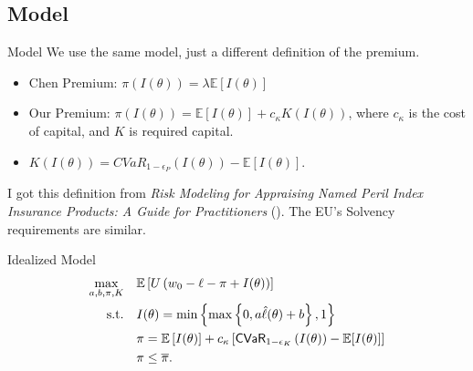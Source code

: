 \documentclass{beamer}
\begin{document}
\subsection{Model}
\begin{frame}{Model}
    We use the same model, just a different definition of the premium.
    \vspace*{1em}
    \begin{itemize}
        \setlength\itemsep{2em}
        \item Chen Premium: $\pi(I(\theta)) = \lambda \mathbb{E}[I(\theta)]$
        \item Our Premium: $\pi(I(\theta)) = \mathbb{E}[I(\theta)] + c_{\kappa} K(I(\theta))$, where $c_{\kappa}$ is the cost of capital, and $K$ is required capital.
    \item $K(I(\theta)) = CVaR_{1-\epsilon_P}\left ( I(\theta) \right ) - \mathbb{E}[I(\theta)]$.
    \end{itemize}
    \vspace*{1em}
    I got this definition from \textit{Risk Modeling for Appraising Named Peril Index Insurance Products: A Guide for Practitioners} (\cite{mapfumo2017risk}). The EU's Solvency requirements are similar. 
\end{frame}

\begin{frame}{Idealized Model}
\label{ideal-model}
\begin{align}
    \max_{a,b,\pi, K}  & \quad \mathbb{E} \left [ U\left ( w_0 - \ell - \pi + I(\theta) \right ) \right ] \label{cons-objective}\\
    \text{s.t.} & \quad I(\theta) =  \min \left \{\max \left \{0,a\hat{\ell}(\theta) + b \right \}, 1 \right \}\label{cons-contract}\\
    & \quad \pi = \mathbb{E}\left [ I(\theta) \right ] + c_{\kappa} \left[ {\sf CVaR}_{1-\epsilon_K}\left ( I(\theta)\right )  - \mathbb{E}[I(\theta)]  \right] \\
    &\quad \pi \leq \overline{\pi}.\label{cons-capital}
\end{align}
\end{frame}
\end{document}
